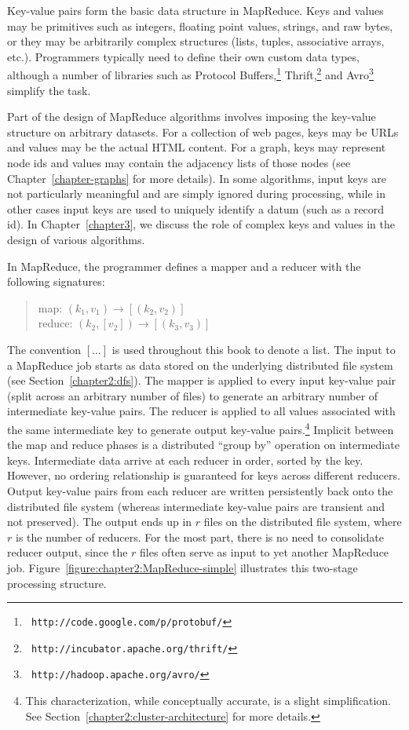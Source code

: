 Key-value pairs form the basic data structure in MapReduce.  Keys and
values may be primitives such as integers, floating point values,
strings, and raw bytes, or they may be arbitrarily complex structures
(lists, tuples, associative arrays, etc.).  Programmers typically need
to define their own custom data types, although a number of libraries
such as Protocol Buffers,\footnote{\texttt{
http://code.google.com/p/protobuf/}} Thrift,\footnote{\texttt{
http://incubator.apache.org/thrift/}} and Avro\footnote{\texttt{
http://hadoop.apache.org/avro/}} simplify the task.

Part of the design of MapReduce algorithms involves imposing the
key-value structure on arbitrary datasets.  For a collection of web
pages, keys may be URLs and values may be the actual HTML content.
For a graph, keys may represent node ids and values may contain the
adjacency lists of those nodes (see Chapter~\ref{chapter-graphs} for
more details). In some algorithms, input keys are not particularly
meaningful and are simply ignored during processing, while in other
cases input keys are used to uniquely identify a datum (such as a
record id).  In Chapter~\ref{chapter3}, we discuss the role of complex
keys and values in the design of various algorithms.

In MapReduce, the programmer defines a mapper and a reducer with the
following signatures:

\begin{quote}
map: $(k_1, v_1) \rightarrow [(k_2, v_2)]$ \\
reduce: $(k_2, [v_2]) \rightarrow [(k_3, v_3)]$
\end{quote}

\noindent The convention $[\ldots]$ is used
throughout this book to denote a list.  The input to a MapReduce job
starts as data stored on the underlying distributed file system (see
Section~\ref{chapter2:dfs}).  The mapper is applied to every input
key-value pair (split across an arbitrary number of files) to generate
an arbitrary number of intermediate key-value pairs.  The reducer is
applied to all values associated with the same intermediate key to
generate output key-value pairs.\footnote{This characterization, while
conceptually accurate, is a slight simplification.  See
Section~\ref{chapter2:cluster-architecture} for more details.}
Implicit between the map and reduce phases is a distributed ``group
by'' operation on intermediate keys.  Intermediate data arrive at each
reducer in order, sorted by the key.  However, no ordering
relationship is guaranteed for keys across different reducers.  Output
key-value pairs from each reducer are written persistently back onto
the distributed file system (whereas intermediate key-value pairs are
transient and not preserved).  The output ends up in $r$ files on the
distributed file system, where $r$ is the number of reducers.  For the
most part, there is no need to consolidate reducer output, since the
$r$ files often serve as input to yet another MapReduce job.
Figure~\ref{figure:chapter2:MapReduce-simple} illustrates this
two-stage processing structure.

